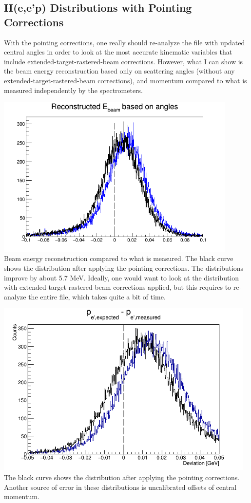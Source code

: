 \documentclass{article}
\begin{document}
\subsection*{H(e,e'p) Distributions with Pointing Corrections}
With the pointing corrections, one really should re-analyze the file with updated central angles in order to look at the most accurate kinematic variables that include extended-target-rastered-beam corrections. However, what I can show is the beam energy reconstruction based only on scattering angles (without any extended-target-rastered-beam corrections), and momentum compared to what is measured independently by the spectrometers.

\begin{center}
\includegraphics[width=12cm]{../report-H/delEnergy.png}\\
Beam energy reconstruction compared to what is measured. The black curve shows the distribution after applying the pointing corrections. The distributions improve by about 5.7 MeV. Ideally, one would want to look at the distribution with extended-target-rastered-beam corrections applied, but this requires to re-analyze the entire file, which takes quite a bit of time.
\end{center}

\begin{center}
\includegraphics[width=13cm]{../report-H/delPe.png}\\
The black curve shows the distribution after applying the pointing corrections. Another source of error in these distributions is uncalibrated offsets of central momentum.
\end{center}
\end{document}
